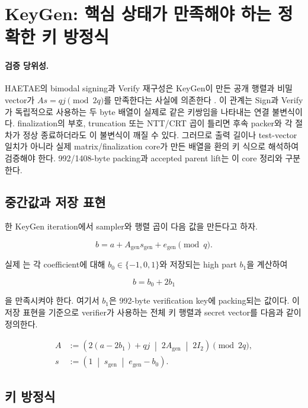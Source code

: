 \section{KeyGen: 핵심 상태가 만족해야 하는 정확한 키 방정식}
\label{sec:keygen}

\paragraph{검증 당위성.}
HAETAE의 bimodal signing과 Verify 재구성은 KeyGen이 만든 공개 행렬과 비밀
vector가 \(As=qj\pmod{2q}\)를 만족한다는 사실에 의존한다
\cite{haetae-spec}. 이 관계는 Sign과 Verify가 독립적으로 사용하는 두 byte
배열이 실제로 같은 키쌍임을 나타내는 연결 불변식이다. finalization의 부호,
truncation 또는 NTT/CRT 곱이 틀리면 후속 packer와 각 절차가 정상 종료하더라도
이 불변식이 깨질 수 있다. 그러므로 출력 길이나 test-vector 일치가 아니라 실제
matrix/finalization core가 만든 배열을 환의 키 식으로 해석하여 검증해야 한다.
992/1408-byte packing과 accepted parent lift는 이 core 정리와 구분한다.

\subsection{중간값과 저장 표현}

한 KeyGen iteration에서 sampler와 행렬 곱이 다음 값을 만든다고 하자.

\[
  b=a+A_{\mathrm{gen}}s_{\mathrm{gen}}+e_{\mathrm{gen}}\pmod q.
  \tag{KG-1}
\]

실제 는 각 coefficient에 대해
\(b_0\in\{-1,0,1\}\)와 저장되는 high part \(b_1\)을 계산하여

\[
  b=b_0+2b_1
  \tag{KG-2}
\]

을 만족시켜야 한다. 여기서 \(b_1\)은 992-byte verification key에 packing되는
값이다. 이 저장 표현을 기준으로 verifier가 사용하는 전체 키 행렬과 secret
vector를 다음과 같이 정의한다.

\begin{align}
A &:=
 \left(
   2(a-2b_1)+qj
   \;\middle|\;
   2A_{\mathrm{gen}}
   \;\middle|\;
   2I_2
 \right)
 \pmod{2q},
 \tag{KG-3}\\
s &:=
 \left(1\;\middle|\;s_{\mathrm{gen}}\;\middle|\;
 e_{\mathrm{gen}}-b_0\right).
 \tag{KG-4}
\end{align}

\subsection{키 방정식}

